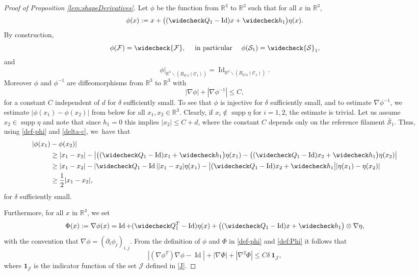 \documentclass[JEP,XML,SOM,Unicode, NoEqCountersInSection,NoFloatCountersInSection,published]{cedram}
\newcommand{\R}{\mathbb{R}}
\DeclareMathOperator{\Id}{Id}
\DeclareMathOperator{\supp}{supp}
\theoremstyle{definition}
\theoremstyle{remark}
\begin{document}
\begin{proof}[Proof of Proposition \ref{lem:shapeDerivatives}]
Let $\phi$ be the function from $\R^3$ to $\R^3$ such that for all $x$ in $\R^3$,
\begin{equation} \label{def-phi}
\phi(x) := x + \bigl((\widecheck Q_1 - \Id)x + \widecheck h_1 \bigr) \eta(x).
\end{equation}
By construction,
\begin{equation} \label{dodomain}
\phi(\mathcal F) = \widecheck {\mathcal F}, \quad \text{ in particular } \quad
\phi(\mathcal S_1) = \widecheck {\mathcal S}_1,
\end{equation}
and
\begin{equation} \label{elaid}
\phi \vert_{\R^3 \smallsetminus (B_{d/4}(\mathcal C_1))} = \Id_{\R^3 \smallsetminus (B_{d/4}(\mathcal C_1))}.
\end{equation}
Moreover $\phi$ and $\phi^{-1}$ are diffeomorphisms from $\R^3$ to $\R^3$
with
\begin{equation}
\label{pourcp}
|\nabla \phi| + |\nabla \phi^{-1}| \leq C,
\end{equation}
for a constant $C$ independent of $d$ for $\delta$ sufficiently small.
To see that $\phi$ is injective for $\delta$ sufficiently small, and to estimate $\nabla \phi^{-1}$, we estimate $|\phi(x_1) - \phi(x_2)|$ from below for all $x_1,x_2 \in \R^3$. Clearly, if $x_i \not \in \supp \eta$ for $i = 1,2$, the estimate is trivial.
Let us assume $x_2 \in \supp \eta$ and note that since $h_1 = 0$ this implies $|x_2| \leq C + d$,
where the constant $C$ depends only on the reference filament $\bar{\mathcal S}_1$.
Thus, using \eqref{def-phi} and \eqref{delta-c}, we~have that
\begin{align*}
|\phi(x_1) &- \phi(x_2)| \\
&\geq |x_1 - x_2| - \big|\big((\widecheck Q_1 - \Id)x_1 + \widecheck h_1 \big) \eta(x_1) - \big((\widecheck Q_1 - \Id)x_2 + \widecheck h_1 \big) \eta(x_2)\big| \\
& \geq |x_1 - x_2| - |\widecheck Q_1 - \Id||x_1 - x_2| \eta(x_1) - \big|(\widecheck Q_1 - \Id)x_2 + \widecheck h_1 \big||\eta(x_1) - \eta(x_2)| \\
& \geq \frac 1 2 |x_1 - x_2|,
\end{align*}
for $\delta$ sufficiently small.

Furthermore, for all $x$ in $\R^3$, we set
\begin{equation} \label{def:Phi}
\Phi(x) := {\nabla\phi(x)} = \Id + (\widecheck Q_1^T - \Id) \eta(x) +
\bigl((\widecheck Q_1 - \Id)x + \widecheck h_1 \bigr) \otimes \nabla \eta,
\end{equation}
with the convention that $\nabla\phi = (\partial_i \phi_j)_{i,j}$.
From the definition of $\phi$ and $\Phi$ in \eqref{def-phi} and \eqref{def:Phi}
it follows that
\begin{equation} \label{esti-mir}
|(\nabla \phi^T) \nabla \phi - \Id|+
|\nabla \Phi|+ |\nabla^2 \Phi| \leq C \delta \ \mathbf{1}_{\mathcal J},
\end{equation}
where $ \mathbf{1}_\mathcal{J}$ is the indicator function of the set $\mathcal{J}$ defined in \eqref{J}.


\end{proof}
\end{document}
